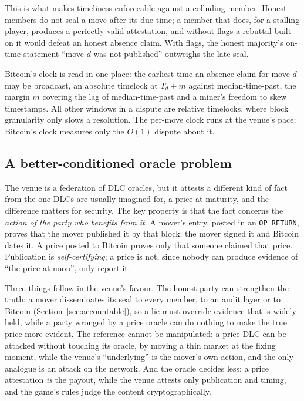 \documentclass[11pt]{article}
\begin{document}
This is what makes timeliness enforceable against a colluding member.
Honest members do not seal a move after its due time; a member that
does, for a stalling player, produces a perfectly valid attestation,
and without flags a rebuttal built on it would defeat an honest
absence claim. With flags, the honest majority's on-time statement
``move $d$ was not published'' outweighs the late seal.

Bitcoin's clock is read in one place: the earliest time an absence claim
for move $d$ may be broadcast, an absolute timelock at $T_d + m$ against
median-time-past, the margin $m$ covering the lag of median-time-past
and a miner's freedom to skew timestamps. All other windows in a dispute
are relative timelocks, where block granularity only slows a resolution.
The per-move clock runs at the venue's pace; Bitcoin's clock measures
only the $O(1)$ dispute about it.

\subsection{A better-conditioned oracle problem}
\label{sec:oracle}

The venue is a federation of DLC oracles, but it attests a different
kind of fact from the one DLCs are usually imagined for, a price at
maturity, and the difference matters for security. The key property is
that the fact concerns the \emph{action of the party who benefits from
it}. A mover's entry, posted in an \texttt{OP\_RETURN}, proves that the
mover published it by that block: the mover signed it and Bitcoin dates
it. A price posted to Bitcoin proves only that someone claimed that
price. Publication is \emph{self-certifying}; a price is not, since
nobody can produce evidence of ``the price at noon'', only report it.

Three things follow in the venue's favour. The honest party can
strengthen the truth: a mover disseminates its seal to every member,
to an audit layer or to Bitcoin (Section~\ref{sec:accountable}), so a
lie must override evidence that is widely held, while a party wronged
by a price oracle can do nothing to make the true price more evident.
The reference cannot be manipulated: a price DLC can be attacked
without touching its oracle, by moving a thin market at the fixing
moment, while the venue's ``underlying'' is the mover's own action, and
the only analogue is an attack on the network. And the oracle decides
less: a price attestation \emph{is} the payout, while the venue attests
only publication and timing, and the game's rules judge the content
cryptographically.
\end{document}
